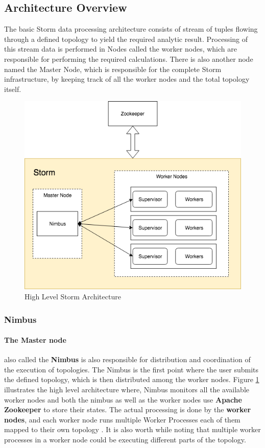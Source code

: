 \documentclass[runningheads,a4paper]{llncs}[2015/06/24]
\begin{document}
\subsection{Architecture Overview}
The basic Storm data processing architecture consists of stream of tuples flowing through a defined topology to yield the required analytic result. Processing of this stream data is performed in Nodes called the worker nodes, which are responsible for performing the required calculations. There is also another node named the Master Node, which is responsible for the complete Storm infrastructure,  by keeping track of all the worker nodes and the total topology itself.

\begin{figure}
  \begin{center}
    \includegraphics[width=.7\textwidth]{arch.png}
    \caption{High Level Storm Architecture}
    \label{fig:arch}
   \end{center}
\end{figure}

\subsubsection{Nimbus}

\paragraph{The Master node} also called the \textbf{Nimbus} is also responsible for distribution and coordination of the execution of topologies. The Nimbus is the first point where the user submits the defined topology, which is then distributed among the worker nodes.  Figure \ref{fig:arch} illustrates the high level architecture where, Nimbus monitors all the available worker nodes and both the nimbus as well as the worker nodes use \textbf{Apache Zookeeper} to store their states. The actual processing is done by the \textbf{worker nodes}, and each worker node runs multiple Worker Processes each of them mapped to their own topology \cite{stormtwitter}. It is also worth while noting that multiple worker processes in a worker node could be executing different parts of the topology.
\end{document}
